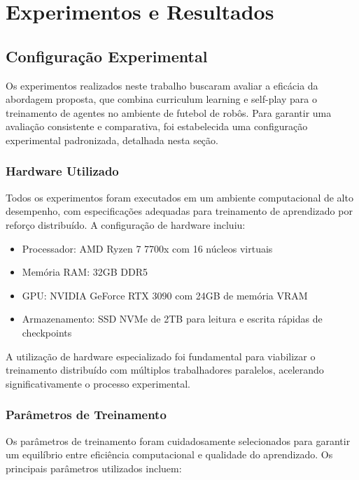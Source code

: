 \chapter{Experimentos e Resultados}
\label{cap:resultados}

\section{Configuração Experimental}
\label{sec:configuracao_experimental}

Os experimentos realizados neste trabalho buscaram avaliar a eficácia da abordagem proposta, que combina curriculum learning e self-play para o treinamento de agentes no ambiente de futebol de robôs. Para garantir uma avaliação consistente e comparativa, foi estabelecida uma configuração experimental padronizada, detalhada nesta seção.

\subsection{Hardware Utilizado}

Todos os experimentos foram executados em um ambiente computacional de alto desempenho, com especificações adequadas para treinamento de aprendizado por reforço distribuído. A configuração de hardware incluiu:

\begin{itemize}
    \item Processador: AMD Ryzen 7 7700x com 16 núcleos virtuais
    \item Memória RAM: 32GB DDR5
    \item GPU: NVIDIA GeForce RTX 3090 com 24GB de memória VRAM
    \item Armazenamento: SSD NVMe de 2TB para leitura e escrita rápidas de checkpoints
\end{itemize}

A utilização de hardware especializado foi fundamental para viabilizar o treinamento distribuído com múltiplos trabalhadores paralelos, acelerando significativamente o processo experimental.

\subsection{Parâmetros de Treinamento}

Os parâmetros de treinamento foram cuidadosamente selecionados para garantir um equilíbrio entre eficiência computacional e qualidade do aprendizado. Os principais parâmetros utilizados incluem:

